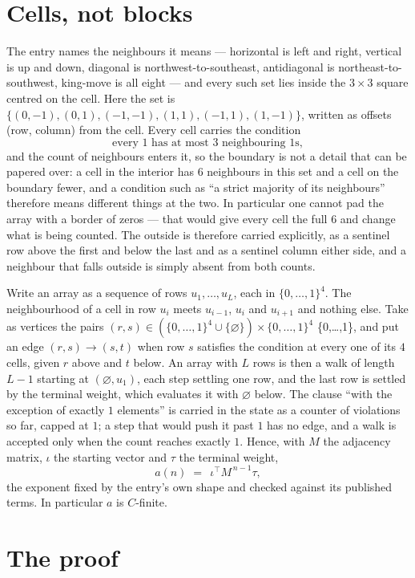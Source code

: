 \documentclass[11pt,a4paper]{article}
\theoremstyle{plain}
\theoremstyle{definition}
\begin{document}
\section{Cells, not blocks}

The entry names the neighbours it means --- horizontal is left and right, vertical is up and
down, diagonal is northwest-to-southeast, antidiagonal is northeast-to-southwest, king-move is
all eight --- and every such set lies inside the $3\times3$ square centred on the cell. Here
the set is $\{(0,-1), (0,1), (-1,-1), (1,1), (-1,1), (1,-1)\}$, written as offsets (row, column) from the cell. Every cell carries
the condition
\[
\text{every 1 has at most 3 neighbouring 1s},
\]
and the count of neighbours enters it, so the boundary is not a detail that can be papered
over: a cell in the interior has $6$ neighbours in this set and a cell on the boundary
fewer, and a condition such as ``a strict majority of its neighbours'' therefore means
different things at the two. In particular one cannot pad the array with a border of zeros ---
that would give every cell the full $6$ and change what is being counted. The outside is
therefore carried
explicitly, as a sentinel row above the first and below the last and as a sentinel column
either side, and a neighbour that falls outside is simply absent from both counts.

Write an array as a sequence of rows $u_1,\dots,u_L$, each in
$\{0,\dots,1\}^{4}$. The neighbourhood of a cell in row $u_i$ meets $u_{i-1}$,
$u_i$ and $u_{i+1}$ and nothing else. Take as vertices the pairs
$(r,s)\in(\{0,\dots,1\}^{4}\cup\{\varnothing\})\times\{0,\dots,1\}^{4}$ \times \{0,\dots,1\},
and put an edge $(r,s)\to(s,t)$ when row $s$ satisfies the condition at every one of its
$4$ cells, given $r$ above and $t$ below. An array with $L$ rows is then a walk of length
$L-1$ starting at $(\varnothing,u_1)$, each step settling one row, and the last row is
settled by the terminal weight, which evaluates it with $\varnothing$ below. The clause ``with the exception of exactly $1$ elements'' is carried in
the state as a counter of violations so far, capped at $1$; a step that would push it past
$1$ has no edge, and a walk is accepted only when the count reaches exactly $1$. Hence,
with $M$ the adjacency matrix, $\iota$ the starting vector and $\tau$ the terminal weight,
\[
a(n)\;=\;\,\iota^{\!\top}M^{\,n-1}\tau ,
\]
the exponent fixed by the entry's own shape and checked against its published terms. In
particular $a$ is $C$-finite.

\section{The proof}
\end{document}
